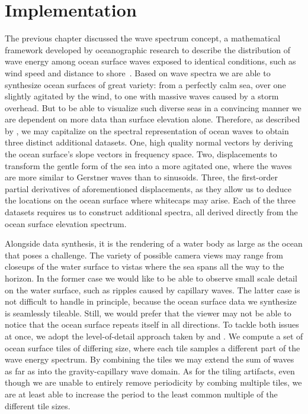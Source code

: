 \chapter{Implementation}
\label{ch:implementation}
%
The previous chapter discussed the wave spectrum concept, a mathematical
framework developed by oceanographic research to describe the distribution of
wave energy among ocean surface waves exposed to identical conditions, such as
wind speed and distance to shore~\citep{Neumann:1966}.
Based on wave spectra we are able to synthesize ocean surfaces of great variety:
from a perfectly calm sea, over one slightly agitated by the wind, to one with
massive waves caused by a storm overhead.
But to be able to visualize such diverse seas in a convincing manner we are dependent on more data
than surface elevation alone. Therefore, as described by \citet{course:simulatingocean},
we may capitalize on the spectral representation of ocean waves to obtain
three distinct additional datasets.
One, high quality normal vectors by deriving the ocean surface's slope vectors in frequency space.
Two, displacements to transform the gentle form of the sea into a more agitated one, where the waves are more similar to Gerstner waves than to sinusoids.
Three, the first-order partial derivatives of aforementioned displacements, as they allow us to deduce the locations on the ocean surface where
whitecaps may arise.
Each of the three datasets requires us to construct additional spectra,
all derived directly from the ocean surface elevation spectrum.

Alongside data synthesis, it is the rendering of a water body as large as the ocean
that poses a challenge. The variety of possible camera views
may range from closeups of the water surface to vistas where the sea spans all
the way to the horizon.
In the former case we would like to be able to observe small scale detail on the
water surface, such as ripples caused by capillary waves.
The latter case is not difficult to handle in principle, because the ocean surface
data we synthesize is seamlessly tileable. Still, we would prefer that the viewer
may not be able to notice that the ocean surface repeats itself in all directions.
To tackle both issues at once, we adopt the level-of-detail approach taken by
\citet{misc:oceanlightingfft} and \citet{article:whitecaps}.
We compute a set of ocean surface tiles of differing size, where each tile samples a
different part of the wave energy spectrum. By combining the tiles we may
extend the sum of waves as far as into the gravity-capillary wave domain.
As for the tiling artifacts, even though we are unable to entirely remove periodicity
by combing multiple tiles, we are at least able to increase the period to the
least common multiple of the different tile sizes.

